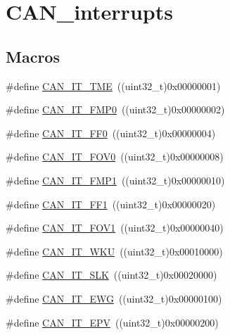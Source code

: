 \hypertarget{group___c_a_n__interrupts}{}\section{C\+A\+N\+\_\+interrupts}
\label{group___c_a_n__interrupts}
\subsection*{Macros}
\begin{DoxyCompactItemize}
\item 
\#define \mbox{\hyperlink{group___c_a_n__interrupts_ga619e36230fa2eb089a7c1936b5004eb9}{C\+A\+N\+\_\+\+I\+T\+\_\+\+T\+ME}}~((uint32\+\_\+t)0x00000001)
\item 
\#define \mbox{\hyperlink{group___c_a_n__interrupts_ga3fe6fbf53e9d692957e87ad329bcd362}{C\+A\+N\+\_\+\+I\+T\+\_\+\+F\+M\+P0}}~((uint32\+\_\+t)0x00000002)
\item 
\#define \mbox{\hyperlink{group___c_a_n__interrupts_gabf63043d9216de80ddc7ffe57b23ef67}{C\+A\+N\+\_\+\+I\+T\+\_\+\+F\+F0}}~((uint32\+\_\+t)0x00000004)
\item 
\#define \mbox{\hyperlink{group___c_a_n__interrupts_ga066a4317f95669e5b5931c9a759cf248}{C\+A\+N\+\_\+\+I\+T\+\_\+\+F\+O\+V0}}~((uint32\+\_\+t)0x00000008)
\item 
\#define \mbox{\hyperlink{group___c_a_n__interrupts_gaa0e101053fb203629e0e9a954213e71e}{C\+A\+N\+\_\+\+I\+T\+\_\+\+F\+M\+P1}}~((uint32\+\_\+t)0x00000010)
\item 
\#define \mbox{\hyperlink{group___c_a_n__interrupts_ga93b86d884ce0624b4b36c991fd75fc1c}{C\+A\+N\+\_\+\+I\+T\+\_\+\+F\+F1}}~((uint32\+\_\+t)0x00000020)
\item 
\#define \mbox{\hyperlink{group___c_a_n__interrupts_ga963301fdbede5f9a9665dc5b6210eaec}{C\+A\+N\+\_\+\+I\+T\+\_\+\+F\+O\+V1}}~((uint32\+\_\+t)0x00000040)
\item 
\#define \mbox{\hyperlink{group___c_a_n__interrupts_gac9c8767770d94de753dda9ad31f9af15}{C\+A\+N\+\_\+\+I\+T\+\_\+\+W\+KU}}~((uint32\+\_\+t)0x00010000)
\item 
\#define \mbox{\hyperlink{group___c_a_n__interrupts_ga639d4ab2777d9a2f8b7e67071b091059}{C\+A\+N\+\_\+\+I\+T\+\_\+\+S\+LK}}~((uint32\+\_\+t)0x00020000)
\item 
\#define \mbox{\hyperlink{group___c_a_n__interrupts_ga8a9f04ddf6ebe169d32b951a8ea135b3}{C\+A\+N\+\_\+\+I\+T\+\_\+\+E\+WG}}~((uint32\+\_\+t)0x00000100)
\item 
\#define \mbox{\hyperlink{group___c_a_n__interrupts_ga006b7b641d337a599ceac64b483e75dd}{C\+A\+N\+\_\+\+I\+T\+\_\+\+E\+PV}}~((uint32\+\_\+t)0x00000200)

\end{DoxyCompactItemize}
